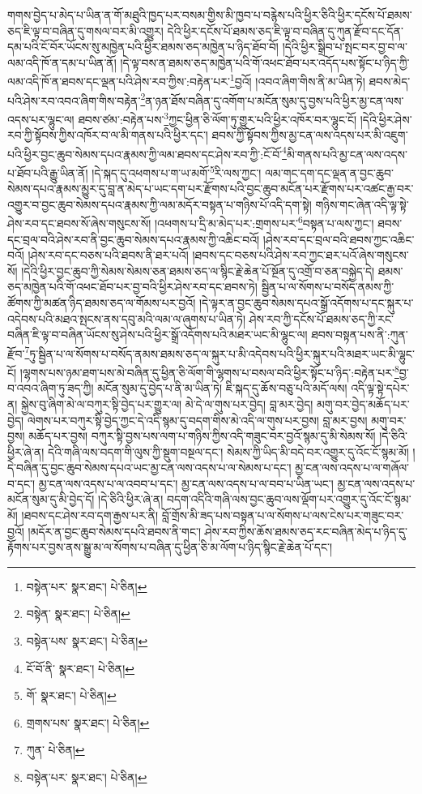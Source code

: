 གགས་བྱེད་པ་མེད་པ་ཡིན་ན་གོ་མཐུའི་ཁྱད་པར་བསམ་གྱིས་མི་ཁྱབ་པ་བརྙེས་པའི་ཕྱིར་ཅིའི་ཕྱིར་དངོས་པོ་ཐམས་ཅད་ཇི་ལྟ་བ་བཞིན་དུ་གསལ་བར་མི་འགྱུར། དེའི་ཕྱིར་དངོས་པོ་ཐམས་ཅད་ཇི་ལྟ་བ་བཞིན་དུ་ཀུན་རྫོབ་དང་དོན་དམ་པའི་ངོ་བོར་ཡོངས་སུ་མཁྱེན་པའི་ཕྱིར་ཐམས་ཅད་མཁྱེན་པ་ཉིད་ཐོབ་བོ། །དེའི་ཕྱིར་སྒྲིབ་པ་སྤང་བར་བྱ་བ་ལ་ལམ་འདི་ཁོ་ན་དམ་པ་ཡིན་ནོ། །དེ་ལྟ་བས་ན་ཐམས་ཅད་མཁྱེན་པའི་གོ་འཕང་ཐོབ་པར་འདོད་པས་སྟོང་པ་ཉིད་ཀྱི་ལམ་འདི་ཁོ་ན་ཐབས་དང་ལྡན་པའི་ཤེས་རབ་ཀྱིས་:བརྟེན་པར་\footnote{བསྟེན་པར་  སྣར་ཐང་།  པེ་ཅིན། }བྱའོ། །འབའ་ཞིག་གིས་ནི་མ་ཡིན་ཏེ། ཐབས་མེད་པའི་ཤེས་རབ་འབའ་ཞིག་གིས་བརྟེན་\footnote{བསྟེན་  སྣར་ཐང་།  པེ་ཅིན། }ན་ཉན་ཐོས་བཞིན་དུ་འགོག་པ་མངོན་སུམ་དུ་བྱས་པའི་ཕྱིར་མྱ་ངན་ལས་འདས་པར་ལྷུང་ལ། ཐབས་ཙམ་:བརྟེན་པས་\footnote{བསྟེན་པས་  སྣར་ཐང་།  པེ་ཅིན། }ཀྱང་ཕྱིན་ཅི་ལོག་ཏུ་གྱུར་པའི་ཕྱིར་འཁོར་བར་ལྷུང་ངོ། །དེའི་ཕྱིར་ཤེས་རབ་ཀྱི་སྟོབས་ཀྱིས་འཁོར་བ་ལ་མི་གནས་པའི་ཕྱིར་དང་། ཐབས་ཀྱི་སྟོབས་ཀྱིས་མྱ་ངན་ལས་འདས་པར་མི་འཇུག་པའི་ཕྱིར་བྱང་ཆུབ་སེམས་དཔའ་རྣམས་ཀྱི་ལམ་ཐབས་དང་ཤེས་རབ་ཀྱི་:ངོ་བོ་\footnote{ངོ་བོ་ནི་  སྣར་ཐང་།  པེ་ཅིན། }མི་གནས་པའི་མྱ་ངན་ལས་འདས་པ་ཐོབ་པའི་རྒྱུ་ཡིན་ནོ། །དེ་སྐད་དུ་འཕགས་པ་ག་ཡ་མགོ་\footnote{གོ་  སྣར་ཐང་།  པེ་ཅིན། }རི་ལས་ཀྱང་། ལམ་གང་དག་དང་ལྡན་ན་བྱང་ཆུབ་སེམས་དཔའ་རྣམས་མྱུར་དུ་བླ་ན་མེད་པ་ཡང་དག་པར་རྫོགས་པའི་བྱང་ཆུབ་མངོན་པར་རྫོགས་པར་འཚང་རྒྱ་བར་འགྱུར་བ་བྱང་ཆུབ་སེམས་དཔའ་རྣམས་ཀྱི་ལམ་མདོར་བསྟན་པ་གཉིས་པོ་འདི་དག་སྟེ། གཉིས་གང་ཞེན་འདི་ལྟ་སྟེ་ཤེས་རབ་དང་ཐབས་སོ་ཞེས་གསུངས་སོ། །འཕགས་པ་དྲི་མ་མེད་པར་:གྲགས་པར་\footnote{གྲགས་པས་  སྣར་ཐང་།  པེ་ཅིན། }བསྟན་པ་ལས་ཀྱང་། ཐབས་དང་བྲལ་བའི་ཤེས་རབ་ནི་བྱང་ཆུབ་སེམས་དཔའ་རྣམས་ཀྱི་འཆིང་བའོ། །ཤེས་རབ་དང་བྲལ་བའི་ཐབས་ཀྱང་འཆིང་བའོ། །ཤེས་རབ་དང་བཅས་པའི་ཐབས་ནི་ཐར་པའོ། །ཐབས་དང་བཅས་པའི་ཤེས་རབ་ཀྱང་ཐར་པའོ་ཞེས་གསུངས་སོ། །དེའི་ཕྱིར་བྱང་ཆུབ་ཀྱི་སེམས་སེམས་ཅན་ཐམས་ཅད་ལ་སྙིང་རྗེ་ཆེན་པོ་སྔོན་དུ་འགྲོ་བ་ཅན་བསྐྱེད་དེ། ཐམས་ཅད་མཁྱེན་པའི་གོ་འཕང་ཐོབ་པར་བྱ་བའི་ཕྱིར་ཤེས་རབ་དང་ཐབས་ཏེ། སྦྱིན་པ་ལ་སོགས་པ་བསོད་ནམས་ཀྱི་ཚོགས་ཀྱི་མཚན་ཉིད་ཐམས་ཅད་ལ་གོམས་པར་བྱའོ། །དེ་ལྟར་ན་བྱང་ཆུབ་སེམས་དཔའ་སྒྲོ་འདོགས་པ་དང་སྐུར་པ་འདེབས་པའི་མཐའ་སྤངས་ནས་དབུ་མའི་ལམ་ལ་ཞུགས་པ་ཡིན་ཏེ། ཤེས་རབ་ཀྱི་དངོས་པོ་ཐམས་ཅད་ཀྱི་རང་བཞིན་ཇི་ལྟ་བ་བཞིན་ཡོངས་སུ་ཤེས་པའི་ཕྱིར་སྒྲོ་འདོགས་པའི་མཐར་ཡང་མི་ལྷུང་ལ། ཐབས་བསྟན་པས་ནི་:ཀུན་རྫོབ་\footnote{ཀུན་  པེ་ཅིན། }ཏུ་སྦྱིན་པ་ལ་སོགས་པ་བསོད་ནམས་ཐམས་ཅད་ལ་སྐུར་པ་མི་འདེབས་པའི་ཕྱིར་སྐུར་པའི་མཐར་ཡང་མི་ལྷུང་ངོ། །ལྷགས་པས་ཉམ་ཐག་པས་མེ་བཞིན་དུ་ཕྱིན་ཅི་ལོག་གི་ལྷགས་པ་བསལ་བའི་ཕྱིར་སྟོང་པ་ཉིད་:བརྟེན་པར་\footnote{བསྟེན་པར་  སྣར་ཐང་།  པེ་ཅིན། }བྱ་བ་འབའ་ཞིག་ཏུ་ཟད་ཀྱི། མངོན་སུམ་དུ་བྱེད་པ་ནི་མ་ཡིན་ཏེ། ཇི་སྐད་དུ་ཆོས་བཅུ་པའི་མདོ་ལས། འདི་ལྟ་སྟེ་དཔེར་ན། སྐྱེས་བུ་ཞིག་མེ་ལ་བཀུར་སྟི་བྱེད་པར་གྱུར་ལ། མེ་དེ་ལ་གུས་པར་བྱེད། བླ་མར་བྱེད། མགུ་བར་བྱེད་མཆོད་པར་བྱེད། ལེགས་པར་བཀུར་སྟི་བྱེད་ཀྱང་དེ་འདི་སྙམ་དུ་བདག་གིས་མེ་འདི་ལ་གུས་པར་བྱས། བླ་མར་བྱས། མགུ་བར་བྱས། མཆོད་པར་བྱས། བཀུར་སྟི་བྱས་པས་ལག་པ་གཉིས་ཀྱིས་འདི་གཟུང་བར་བྱའོ་སྙམ་དུ་མི་སེམས་སོ། །དེ་ཅིའི་ཕྱིར་ཞེ་ན། དེའི་གཞི་ལས་བདག་གི་ལུས་ཀྱི་སྡུག་བསྔལ་དང་། སེམས་ཀྱི་ཡིད་མི་བདེ་བར་འགྱུར་དུ་འོང་ངོ་སྙམ་མོ། །དེ་བཞིན་དུ་བྱང་ཆུབ་སེམས་དཔའ་ཡང་མྱ་ངན་ལས་འདས་པ་ལ་སེམས་པ་དང་། མྱ་ངན་ལས་འདས་པ་ལ་གཞོལ་བ་དང་། མྱ་ངན་ལས་འདས་པ་ལ་འབབ་པ་དང་། མྱ་ངན་ལས་འདས་པ་ལ་བབ་པ་ཡིན་ཡང་། མྱ་ངན་ལས་འདས་པ་མངོན་སུམ་དུ་མི་བྱེད་དོ། །དེ་ཅིའི་ཕྱིར་ཞེ་ན། བདག་འདིའི་གཞི་ལས་བྱང་ཆུབ་ལས་ལྡོག་པར་འགྱུར་དུ་འོང་ངོ་སྙམ་མོ། །ཐབས་དང་ཤེས་རབ་དག་རྒྱས་པར་ནི། བློ་གྲོས་མི་ཟད་པས་བསྟན་པ་ལ་སོགས་པ་ལས་ངེས་པར་གཟུང་བར་བྱའོ། །མདོར་ན་བྱང་ཆུབ་སེམས་དཔའི་ཐབས་ནི་གང་། ཤེས་རབ་ཀྱིས་ཆོས་ཐམས་ཅད་རང་བཞིན་མེད་པ་ཉིད་དུ་རྟོགས་པར་བྱས་ནས་སྒྱུ་མ་ལ་སོགས་པ་བཞིན་དུ་ཕྱིན་ཅི་མ་ལོག་པ་ཉིད་སྙིང་རྗེ་ཆེན་པོ་དང་། 